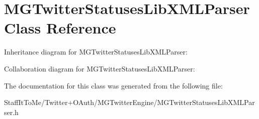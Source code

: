 \hypertarget{interface_m_g_twitter_statuses_lib_x_m_l_parser}{
\section{\-M\-G\-Twitter\-Statuses\-Lib\-X\-M\-L\-Parser \-Class \-Reference}
\label{interface_m_g_twitter_statuses_lib_x_m_l_parser}
}


\-Inheritance diagram for \-M\-G\-Twitter\-Statuses\-Lib\-X\-M\-L\-Parser\-:


\-Collaboration diagram for \-M\-G\-Twitter\-Statuses\-Lib\-X\-M\-L\-Parser\-:


\-The documentation for this class was generated from the following file\-:\begin{DoxyCompactItemize}
\item 
\-Staff\-It\-To\-Me/\-Twitter+\-O\-Auth/\-M\-G\-Twitter\-Engine/\-M\-G\-Twitter\-Statuses\-Lib\-X\-M\-L\-Parser.\-h\end{DoxyCompactItemize}
